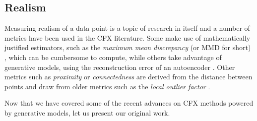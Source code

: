\documentclass[../main.tex]{subfiles}
\begin{document}
\subsection{Realism}

Measuring realism of a data point is a topic of research in itself and a number of metrics have been used in the CFX literature.
Some make use of mathematically justified estimators, such as the \emph{maximum mean discrepancy} (or MMD for short) \cite{zhangInterpretable2022}, which can be cumbersome to compute, while others take advantage of generative models, \eg{} using the reconstruction error of an autoencoder \cite{vanlooverenInterpretable2021}.
Other metrics such as \emph{proximity} or \emph{connectedness} \cite{laugelIssues2019} are derived from the distance between points and draw from older metrics such as the \emph{local outlier factor} \cite{breunigLOF2000}.

Now that we have covered some of the recent advances on CFX methods powered by generative models, let us present our original work.
\end{document}
